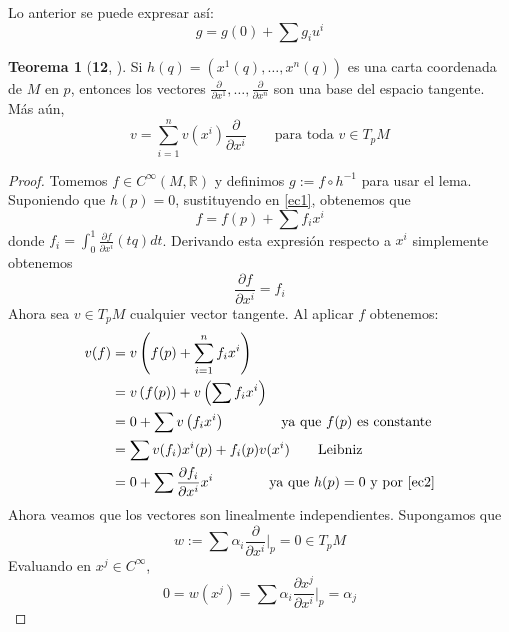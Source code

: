\documentclass[spanish]{book}
\theoremstyle{definition}
\newtheorem*{teo}{Teorema}
\newcommand{\R}{\mathbb{R}}
\newcommand{\Cinf}{C^\infty}
\begin{document}
	Lo anterior se puede expresar así:
	\begin{equation}\label{ec1}
		g=g(0)+\sum g_iu^i
	\end{equation}
	\begin{teo}[\textbf{12}, \cite{ONeill}]\label{teo:base}
		Si $h(q)=(x^1(q),\ldots,x^n(q))$ es una carta coordenada de $M$ en $p$, entonces los vectores $\frac{\partial}{\partial x^1}, \ldots, \frac{\partial}{\partial x^n}
		$ son una base del espacio tangente. Más aún,
		\[v = \sum_{i=1}^n v(x^i) \frac{\partial}{\partial x^i} \qquad \text{para toda } v \in T_pM\]
	\end{teo}
	\begin{proof}
		Tomemos $f\in\Cinf(M,\R)$ y definimos $g:=f\circ h^{-1}$ para usar el lema. Suponiendo que $h(p)=0$, sustituyendo en \ref{ec1}, obtenemos que 
		\[f=f(p)+\sum f_ix^i\]
		donde $f_i=\int_0^1\frac{\partial f}{\partial x^i}(tq)dt$. Derivando esta expresión respecto a $x^i$ simplemente obtenemos
		\begin{equation}\label{ec2}
			\frac{\partial f}{\partial x^i}=f_i
		\end{equation}
		Ahora sea $v\in T_pM$ cualquier vector tangente. Al aplicar $f$ obtenemos:
		\begin{align*}
			v(f) &= v\left(f(p)+\sum_{i=1}^nf_ix^i\right) \\
			&= v\left(f(p)\right)+v\left(\sum f_i x^i\right) \\
			&=0+ \sum v\left(f_i x^i\right)\qquad\qquad\text{ya que }f(p)\text{ es constante} \\
			&=\sum v(f_i)x^i(p)+f_i(p)v(x^i)\qquad\text{Leibniz}\\
			&=0+\sum \frac{\partial f_i}{\partial x^i}x^i\qquad\qquad\text{ya que }h(p)=0\text{ y por }\ref{ec2}
		\end{align*}
		Ahora veamos que los vectores son linealmente independientes. Supongamos que
		\[w:=\sum\alpha_i\frac{\partial}{\partial{x^i}}\Bigg|_{p}=0\in T_pM\]
		Evaluando en $x^j\in\Cinf$,
		\[0=w(x^j)=\sum\alpha_i\frac{\partial x^j}{\partial{x^i}}\Bigg|_{p}=\alpha_j\]
	\end{proof}
\end{document}

